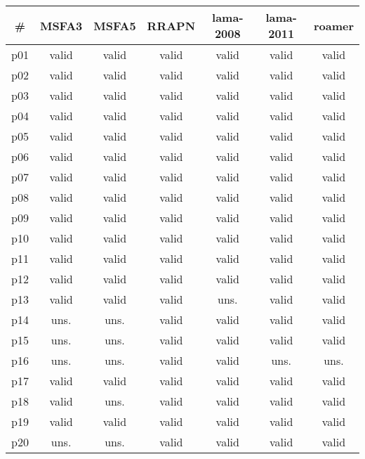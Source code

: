 \begin{tabular}{ccccccc}
\toprule
\textbf{\#} & \textbf{MSFA3} & \textbf{MSFA5} & \textbf{RRAPN} & \textbf{lama-2008} & \textbf{lama-2011} & \textbf{roamer}\\
\midrule
p01 & valid & valid & valid & valid & valid & valid\\
p02 & valid & valid & valid & valid & valid & valid\\
p03 & valid & valid & valid & valid & valid & valid\\
p04 & valid & valid & valid & valid & valid & valid\\
p05 & valid & valid & valid & valid & valid & valid\\
p06 & valid & valid & valid & valid & valid & valid\\
p07 & valid & valid & valid & valid & valid & valid\\
p08 & valid & valid & valid & valid & valid & valid\\
p09 & valid & valid & valid & valid & valid & valid\\
p10 & valid & valid & valid & valid & valid & valid\\
p11 & valid & valid & valid & valid & valid & valid\\
p12 & valid & valid & valid & valid & valid & valid\\
p13 & valid & valid & valid & uns. & valid & valid\\
p14 & uns. & uns. & valid & valid & valid & valid\\
p15 & uns. & uns. & valid & valid & valid & valid\\
p16 & uns. & uns. & valid & valid & uns. & uns.\\
p17 & valid & valid & valid & valid & valid & valid\\
p18 & valid & uns. & valid & valid & valid & valid\\
p19 & valid & valid & valid & valid & valid & valid\\
p20 & uns. & uns. & valid & valid & valid & valid\\
\bottomrule
\end{tabular}

